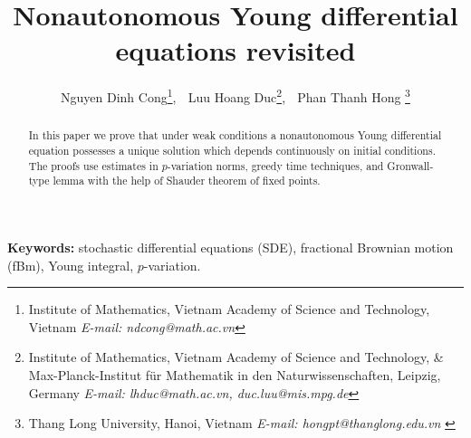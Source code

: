 \documentclass[10pt]{article}
\numberwithin{equation}{section} %
\begin{document}
	

\title{Nonautonomous Young differential equations revisited}
\author{
Nguyen Dinh Cong\thanks{Institute of Mathematics, Vietnam Academy of Science and Technology, Vietnam {\it E-mail: ndcong@math.ac.vn}}, $\;$ Luu Hoang Duc\thanks{Institute of Mathematics, Vietnam Academy of Science and Technology, \& Max-Planck-Institut f\"ur Mathematik in den Naturwissenschaften, Leipzig, Germany {\it E-mail: lhduc@math.ac.vn, duc.luu@mis.mpg.de}}, $\;$ Phan Thanh Hong \thanks{Thang Long University, Hanoi, Vietnam {\it E-mail: hongpt@thanglong.edu.vn }}}
\date{}
\maketitle


\begin{abstract}
In this paper we prove that under weak conditions a nonautonomous Young differential equation possesses a unique solution which depends continuously on initial conditions. The proofs use estimates in $p$-variation norms,  greedy time techniques, and Gronwall-type lemma with the help of Shauder theorem of fixed points. 
\end{abstract}


{\bf Keywords:}
stochastic differential equations (SDE), fractional Brownian motion (fBm), Young integral, $p$-variation.

\end{document}
